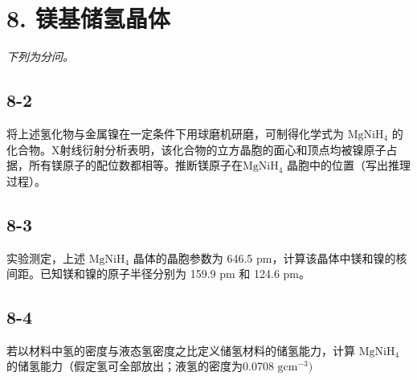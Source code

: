 \section*{8. 镁基储氢晶体}
\textit{下列为分问。}

\subsection*{8-2}
将上述氢化物与⾦属镍在⼀定条件下⽤球磨机研磨，可制得化学式为 $\mathrm { M g N i H _ { 4 } }$ 的化合物。X射线衍射分析表明，该化合物的⽴⽅晶胞的⾯⼼和顶点均被镍原⼦占据，所有镁原⼦的配位数都相等。推断镁原⼦在$\mathrm { M g N i H _ { 4 } }$ 晶胞中的位置（写出推理过程）。

\subsection*{8-3}
实验测定，上述 $\mathrm { M g N i H _ { 4 } }$ 晶体的晶胞参数为 646.5 pm，计算该晶体中镁和镍的核间距。已知镁和镍的原⼦半径分别为 159.9 pm 和 124.6 pm。

\subsection*{8-4}
若以材料中氢的密度与液态氢密度之⽐定义储氢材料的储氢能⼒，计算 $\mathrm { M g N i H _ { 4 } }$ 的储氢能⼒（假定氢可全部放出；液氢的密度为0.0708 $\mathrm { g c m ^ { - 3 } } )$
